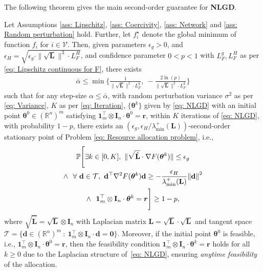 \documentclass{siamart251216}
\begin{document}
The following theorem gives the main second-order guarantee for \textbf{NLGD}.

\begin{theorem}
\label{the: Approximate second order}
    Let Assumptions \ref{ass: Lipschitz}, \ref{ass: Coercivity}, \ref{ass: Network} and \ref{ass: Random perturbation} hold. Further, let $f_{i}^{\star}$ denote the global minimum of function $f_{i}$ for $i\in\mathcal{V}$. Then, given parameters $\epsilon_{g} > 0$, and $\epsilon_{H} = \sqrt{\epsilon_{g} \cdot\|\sqrt{\mathbf{L}}\|^{3} \cdot L_{F}^{H}}$, and confidence parameter $0 < p < 1$ with $L_{F}^{g},L_{F}^{H}$ as per \eqref{eq: Lipschitz continuous for F}, there exists
    \begin{gather*}
        \bar{\alpha} \le \min\{\frac{1}{\|\sqrt{\mathbf{L}}\|^{2} \cdot L_{F}^{g}},~-\frac{2\ln{(p)}}{\|\sqrt{\mathbf{L}}\|^{2} \cdot L_{F}^{g}}\}
    \end{gather*}
    such that for any step-size $\alpha \le \bar{\alpha}$, with random perturbation
    variance $\sigma^{2}$ as per \eqref{eq: Variance}, $K$ as per \eqref{eq: Iteration}, $\{\boldsymbol{\theta}^{k}\}$ given by \eqref{eq: NLGD} with an initial point $\boldsymbol{\theta}^{0} \in (\mathbb{R}^{n})^{m}$ satisfying $\bm{1}_{m}^{\top} \otimes \mathbf{I}_{n} \cdot \boldsymbol{\theta}^{0} = \bm{r}$, within $K$ iterations of \eqref{eq: NLGD}, with probability $1-p$, there exists an $(\epsilon_{g},\epsilon_{H}/\lambda_{\min}^{+}(\mathbf{L}))$-second-order stationary point of Problem \eqref{eq: Resource allocation problem}, i.e.,
    \begin{multline*}
        \mathbb{P} \Bigg[\exists k \in [0,K],~\|\sqrt{\hat{\mathbf{L}}} \cdot \nabla F(\boldsymbol{\theta}^{k})\| \le\epsilon_{g}\\
        \land~~\forall~\mathbf{d} \in \mathcal{T},~\mathbf{d}^{\top} \nabla^{2} F(\boldsymbol{\theta}^{k}) \mathbf{d} \ge - \frac{\epsilon_{H}}{\lambda_{\min}^{+}(\mathbf{L})} \norm{\mathbf{d}}^{2}\\
        \land~~\bm{1}_{m}^{\top} \otimes \mathbf{I}_{n} \cdot \boldsymbol{\theta}^{k} = \bm{r}\Bigg] \ge 1 - p,
    \end{multline*}
     where $\sqrt{\hat{\mathbf{L}}} = \sqrt{\mathbf{L}}\otimes \mathbf{I}_{n}$ with Laplacian matrix $\mathbf{L} = \sqrt{\mathbf{L}} \cdot \sqrt{\mathbf{L}}$ and tangent space $\mathcal{T} = \{\mathbf{d} \in (\mathbb{R}^{n})^{m}~:~\bm{1}_{m}^{\top} \otimes \mathbf{I}_{n} \cdot \mathbf{d} = \bm{0}\}$. Moreover, if the initial point $\boldsymbol{\theta}^{0}$ is feasible, i.e., $\bm{1}_{m}^{\top} \otimes \mathbf{I}_{n} \cdot \boldsymbol{\theta}^{0} = \bm{r}$, then the feasibility condition $\bm{1}_{m}^{\top} \otimes \mathbf{I}_{n} \cdot \boldsymbol{\theta}^{k} = \bm{r}$ holds for all $k \ge 0$ due to the Laplacian structure of~\eqref{eq: NLGD}, ensuring \emph{anytime feasibility} of the allocation.
\end{theorem}
\end{document}
